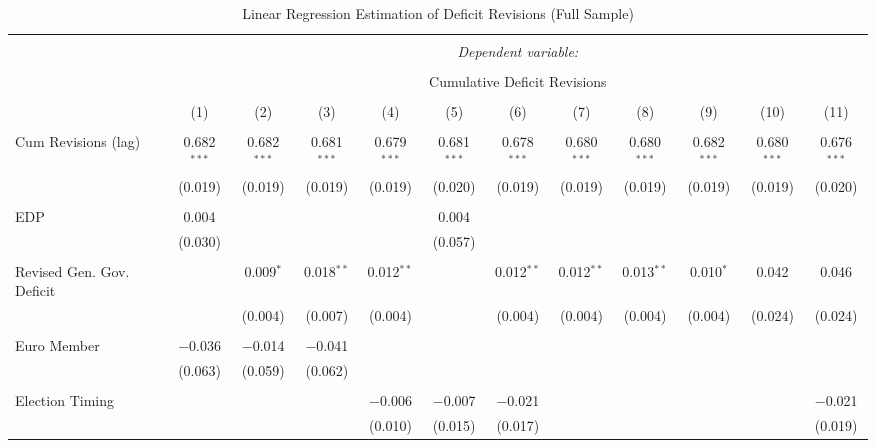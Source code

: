 
\begin{table}[!htbp] \centering 
  \caption{Linear Regression Estimation of Deficit Revisions (Full Sample)} 
  \label{deficit_results} 
\tiny 
\begin{tabular}{@{\extracolsep{5pt}}lccccccccccc} 
\\[-1.8ex]\hline 
\hline \\[-1.8ex] 
 & \multicolumn{11}{c}{\textit{Dependent variable:}} \\ 
\cline{2-12} 
\\[-1.8ex] & \multicolumn{11}{c}{Cumulative Deficit Revisions} \\ 
\\[-1.8ex] & (1) & (2) & (3) & (4) & (5) & (6) & (7) & (8) & (9) & (10) & (11)\\ 
\hline \\[-1.8ex] 
 Cum Revisions (lag) & 0.682$^{***}$ & 0.682$^{***}$ & 0.681$^{***}$ & 0.679$^{***}$ & 0.681$^{***}$ & 0.678$^{***}$ & 0.680$^{***}$ & 0.680$^{***}$ & 0.682$^{***}$ & 0.680$^{***}$ & 0.676$^{***}$ \\ 
  & (0.019) & (0.019) & (0.019) & (0.019) & (0.020) & (0.019) & (0.019) & (0.019) & (0.019) & (0.019) & (0.020) \\ 
  & & & & & & & & & & & \\ 
 EDP & 0.004 &  &  &  & 0.004 &  &  &  &  &  &  \\ 
  & (0.030) &  &  &  & (0.057) &  &  &  &  &  &  \\ 
  & & & & & & & & & & & \\ 
 Revised Gen. Gov. Deficit &  & 0.009$^{*}$ & 0.018$^{**}$ & 0.012$^{**}$ &  & 0.012$^{**}$ & 0.012$^{**}$ & 0.013$^{**}$ & 0.010$^{*}$ & 0.042 & 0.046 \\ 
  &  & (0.004) & (0.007) & (0.004) &  & (0.004) & (0.004) & (0.004) & (0.004) & (0.024) & (0.024) \\ 
  & & & & & & & & & & & \\ 
 Euro Member & $-$0.036 & $-$0.014 & $-$0.041 &  &  &  &  &  &  &  &  \\ 
  & (0.063) & (0.059) & (0.062) &  &  &  &  &  &  &  &  \\ 
  & & & & & & & & & & & \\ 
 Election Timing &  &  &  & $-$0.006 & $-$0.007 & $-$0.021 &  &  &  &  & $-$0.021 \\ 
  &  &  &  & (0.010) & (0.015) & (0.017) &  &  &  &  & (0.019) \\ 

\end{tabular}
\end{table}
